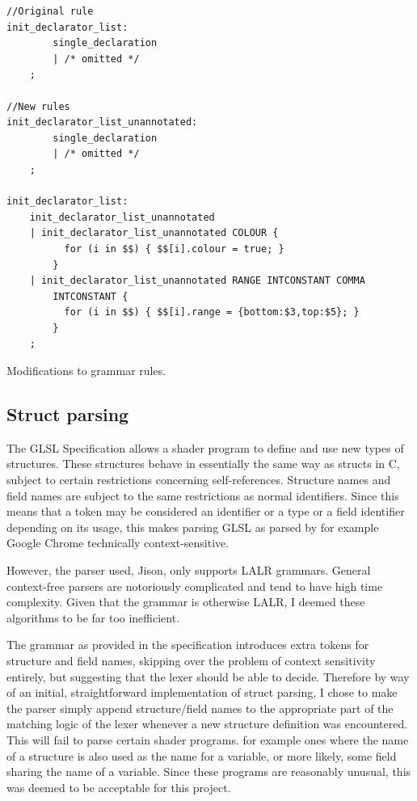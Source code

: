 \documentclass[12pt,twoside,notitlepage]{report}
\begin{document}
\begin{listing}
\begin{verbatim}
//Original rule
init_declarator_list:
        single_declaration
        | /* omitted */
	;

//New rules
init_declarator_list_unannotated:
        single_declaration
        | /* omitted */
	;

init_declarator_list:
	init_declarator_list_unannotated
	| init_declarator_list_unannotated COLOUR { 
          for (i in $$) { $$[i].colour = true; } 
        }
	| init_declarator_list_unannotated RANGE INTCONSTANT COMMA 
        INTCONSTANT { 
          for (i in $$) { $$[i].range = {bottom:$3,top:$5}; } 
        }
	;
\end{verbatim}
\caption{Modifications to grammar rules.\label{rules}}
\end{listing}

\subsection{Struct parsing}
\label{struct-parse}
The GLSL Specification \citet{glsl-spec} allows a shader program to define and use new types of structures. These structures behave in essentially the same way as structs in C, subject to certain restrictions concerning self-references. Structure names and field names are subject to the same restrictions as normal identifiers. Since this means that a token may be considered an identifier or a type or a field identifier depending on its usage, this makes parsing GLSL as parsed by for example Google Chrome technically context-sensitive. 

However, the parser used, Jison, only supports LALR grammars. General context-free parsers are notoriously complicated and tend to have high time complexity. Given that the grammar is otherwise LALR, I deemed these algorithms to be far too inefficient.

The grammar as provided in the specification introduces extra tokens for structure and field names, skipping over the problem of context sensitivity entirely, but suggesting that the lexer should be able to decide. Therefore by way of an initial, straightforward implementation of struct parsing, I chose to make the parser simply append structure/field names to the appropriate part of the matching logic of the lexer whenever a new structure definition was encountered. This will fail to parse certain shader programs. for example ones where the name of a structure is also used as the name for a variable, or more likely, some field sharing the name of a variable. Since these programs are reasonably unusual, this was deemed to be acceptable for this project.
\end{document}
